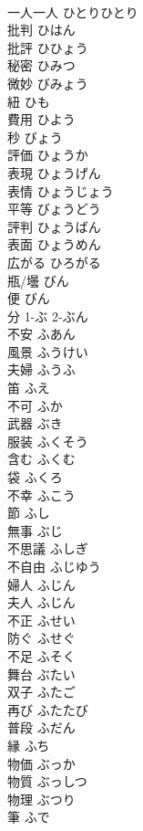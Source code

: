 \documentclass[8pt]{extreport}
\begin{document}
\begin{CJK}{UTF8}{min}
\\	一人一人	ひとりひとり	
\\	批判	ひはん	
\\	批評	ひひょう	
\\	秘密	ひみつ	
\\	微妙	びみょう	
\\	紐	ひも	
\\	費用	ひよう	
\\	秒	びょう	
\\	評価	ひょうか	
\\	表現	ひょうげん	
\\	表情	ひょうじょう	
\\	平等	びょうどう	
\\	評判	ひょうばん	
\\	表面	ひょうめん	
\\	広がる	ひろがる	
\\	瓶/壜	びん	
\\	便	びん	
\\	分	1-ぶ 2-ぶん	
\\	不安	ふあん	
\\	風景	ふうけい	
\\	夫婦	ふうふ	
\\	笛	ふえ	
\\	不可	ふか	
\\	武器	ぶき	
\\	服装	ふくそう	
\\	含む	ふくむ	
\\	袋	ふくろ	
\\	不幸	ふこう	
\\	節	ふし	
\\	無事	ぶじ	
\\	不思議	ふしぎ	
\\	不自由	ふじゆう	
\\	婦人	ふじん	
\\	夫人	ふじん	
\\	不正	ふせい	
\\	防ぐ	ふせぐ	
\\	不足	ふそく	
\\	舞台	ぶたい	
\\	双子	ふたご	
\\	再び	ふたたび	
\\	普段	ふだん	
\\	縁	ふち	
\\	物価	ぶっか	
\\	物質	ぶっしつ	
\\	物理	ぶつり	
\\	筆	ふで	

\end{CJK}
\end{document}
